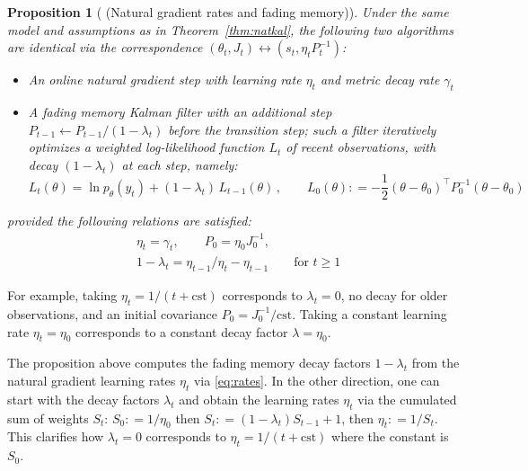 \documentclass[11pt,a4paper]{article}
\renewcommand{\geq}{\geqslant}
\newcommand{\deq}{\mathrel{\mathop{:}}=}
\newcommand{\1}{\mathbbm{1}}
\theoremstyle{yannthm}
\newtheorem{prop}[defi]{Proposition}
\theoremstyle{yannthm2}
\newcommand{\transp}[1]{#1^{\!\top}\!}
\numberwithin{equation}{section}
\begin{document}
\begin{prop}[ (Natural gradient rates and fading memory)]
\label{prop:rates}
Under the same model and assumptions as in Theorem~\ref{thm:natkal},
the following two algorithms are identical via the correspondence
$(\theta_t,J_t)\leftrightarrow (s_t,\eta_t P_t^{-1})$:
\begin{itemize}
\item An online natural gradient step with learning rate $\eta_t$ and
metric decay rate $\gamma_t$

\item A fading memory Kalman filter with an additional step $P_{t-1} \gets
P_{t-1}/(1-\lambda_t)$ before the transition step; such a filter iteratively optimizes a weighted
log-likelihood function $L_t$ of recent observations, with decay
$(1-\lambda_t)$ at each step, namely:
\begin{equation}
L_t(\theta)=\ln p_\theta(y_t)+(1-\lambda_t)\,L_{t-1}(\theta)
\,,\qquad L_0(\theta)\deq -\frac12 
\transp{(\theta-\theta_0)}P_0^{-1}(\theta-\theta_0)
\end{equation}
\end{itemize}
provided the following relations are satisfied:
\begin{align}
&\eta_t=\gamma_t,\qquad P_0=\eta_0 J_0^{-1},
\\&
\label{eq:rates}
1-\lambda_t=%
\eta_{t-1}/\eta_t - \eta_{t-1} \qquad \text{for $t \geq 1$}%
\end{align}
\end{prop}

For example, taking $\eta_t=1/(t+\mathrm{cst})$ corresponds to
$\lambda_t=0$, no decay for older observations, and an initial covariance
$P_0=J_0^{-1}/\mathrm{cst}$. Taking a constant learning rate
$\eta_t=\eta_0$ corresponds to a constant decay factor $\lambda=\eta_0$.

The proposition above computes the fading memory decay factors
$1-\lambda_t$ from the natural gradient learning rates $\eta_t$ via
\eqref{eq:rates}.
In the other direction, one can start with the decay factors $\lambda_t$ and obtain
the learning rates $\eta_t$ via the cumulated sum of weights $S_t$: $S_0\deq
1/\eta_0$ then $S_t\deq
(1-\lambda_t)S_{t-1}+1$, then $\eta_t\deq1/S_t$.
This clarifies how $\lambda_t=0$ corresponds to
$\eta_t=1/(t+\mathrm{cst})$ where the constant is $S_0$.
\end{document}
